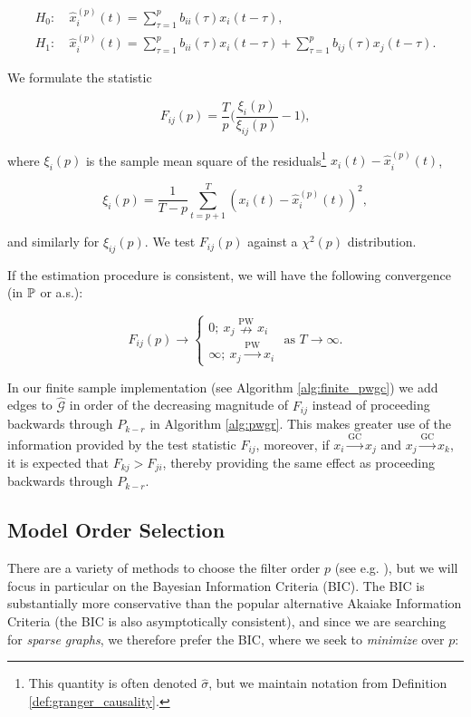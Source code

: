 \documentclass[12pt]{article}
\def\gc{\overset{\text{GC}}{\rightarrow}}  %
\def\pwgc{\overset{\text{PW}}{\rightarrow}}  %
\def\npwgc{\overset{\text{PW}}{\nrightarrow}}  %
\def\gcg{\mathcal{G}}  %
\begin{document}
\begin{align}
  H_0:&\ \widehat{x}_i^{(p)}(t) = \sum_{\tau = 1}^{p} b_{ii}(\tau)x_i(t - \tau),\\
  H_1:&\ \widehat{x}_i^{(p)}(t) = \sum_{\tau = 1}^{p} b_{ii}(\tau)x_i(t - \tau) + \sum_{\tau = 1}^pb_{ij}(\tau)x_j(t - \tau).
\end{align}

We formulate the statistic 

\begin{equation}
  \label{eqn:gc_statistics}
  F_{ij}(p) = \frac{T}{p}\Big(\frac{\xi_i(p)}{\xi_{ij}(p)} - 1\Big),
\end{equation}

where $\xi_i(p)$ is the sample mean square of the
residuals\footnote{This quantity is often denoted $\widehat{\sigma}$,
  but we maintain notation from Definition
  \ref{def:granger_causality}.}  $x_i(t) - \widehat{x}^{(p)}_i(t)$,

\begin{equation*}
  \xi_i(p) = \frac{1}{T - p}\sum_{t = p + 1}^T (x_i(t) - \widehat{x}_i^{(p)}(t))^2,
\end{equation*}

and similarly for $\xi_{ij}(p)$.  We test $F_{ij}(p)$ against a
$\chi^2(p)$ distribution.

If the estimation procedure is consistent, we will have the following
convergence (in $\P$ or a.s.):

\begin{equation}
  F_{ij}(p) \rightarrow
  \left\{
    \begin{array}{ll}
      0;\ x_j \npwgc x_i\\
      \infty;\ x_j \pwgc x_i
    \end{array}
  \right. \text{ as } T \rightarrow \infty.  %
\end{equation}

In our finite sample implementation (see Algorithm
\ref{alg:finite_pwgc}) we add edges to $\widehat{\gcg}$ in order of
the decreasing magnitude of $F_{ij}$ instead of proceeding backwards
through $P_{k - r}$ in Algorithm \ref{alg:pwgr}.  This makes greater
use of the information provided by the test statistic $F_{ij}$,
moreover, if $x_i \gc x_j$ and $x_j \gc x_k$, it is expected that
$F_{kj} > F_{ji}$, thereby providing the same effect as proceeding
backwards through $P_{k - r}$.
\subsection{Model Order Selection}
\label{sec:model_order_selection}
There are a variety of methods to choose the filter order $p$ (see
e.g. \cite{lutkepohl2005new}), but we will focus in particular on the
Bayesian Information Criteria (BIC).  The BIC is substantially more
conservative than the popular alternative Akaiake Information Criteria
(the BIC is also asymptotically consistent), and since we are
searching for \textit{sparse graphs}, we therefore prefer the BIC,
where we seek to \textit{minimize} over $p$:
\end{document}

